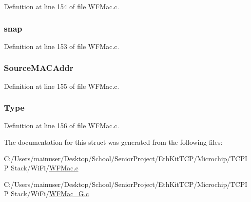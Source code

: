 Definition at line 154 of file W\+F\+Mac.\+c.

\hypertarget{structt_w_f_rx_preamble_a54aafe39438681861f7bce54ffceb534}{}
\subsubsection[{snap}]{ snap}\label{structt_w_f_rx_preamble_a54aafe39438681861f7bce54ffceb534}


Definition at line 153 of file W\+F\+Mac.\+c.

\hypertarget{structt_w_f_rx_preamble_a4cce91226011afc994b97a630ac3fbf6}{}
\subsubsection[{Source\+M\+A\+C\+Addr}]{ Source\+M\+A\+C\+Addr}\label{structt_w_f_rx_preamble_a4cce91226011afc994b97a630ac3fbf6}


Definition at line 155 of file W\+F\+Mac.\+c.

\hypertarget{structt_w_f_rx_preamble_ab2bf26921a49be66edb22ec5294bdfc9}{}
\subsubsection[{Type}]{ Type}\label{structt_w_f_rx_preamble_ab2bf26921a49be66edb22ec5294bdfc9}


Definition at line 156 of file W\+F\+Mac.\+c.



The documentation for this struct was generated from the following files\+:\begin{DoxyCompactItemize}
\item 
C\+:/\+Users/mainuser/\+Desktop/\+School/\+Senior\+Project/\+Eth\+Kit\+T\+C\+P/\+Microchip/\+T\+C\+P\+I\+P Stack/\+Wi\+Fi/\hyperlink{_w_f_mac_8c}{W\+F\+Mac.\+c}\item 
C\+:/\+Users/mainuser/\+Desktop/\+School/\+Senior\+Project/\+Eth\+Kit\+T\+C\+P/\+Microchip/\+T\+C\+P\+I\+P Stack/\+Wi\+Fi/\hyperlink{_w_f_mac__24_g_8c}{W\+F\+Mac\+\_\+G.\+c}\end{DoxyCompactItemize}

